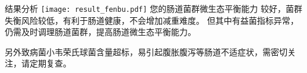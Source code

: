 \vspace*{0mm}

\begin{spacing}{1.5}

\begin{LRaside}[.8]{\fontsize{8.8pt}{11pt}\selectfont 结果分析}
\noindent
\texttt{[image: result\_fenbu.pdf]}
\asidebreak %
\fontsize{8pt}{11pt}\selectfont
您的肠道菌群微生态平衡能力
较好，菌群失衡风险较低，有利于肠道健康，不会增加减重难度。
但其中有益菌指标异常，仍需及时调理肠道菌群，提高肠道微生态平衡能力。


\noindent 另外致病菌小韦荣氏球菌含量超标，易引起腹胀腹泻等肠道不适症状，需密切关注，请定期复查。

\end{LRaside}

\end{spacing}



